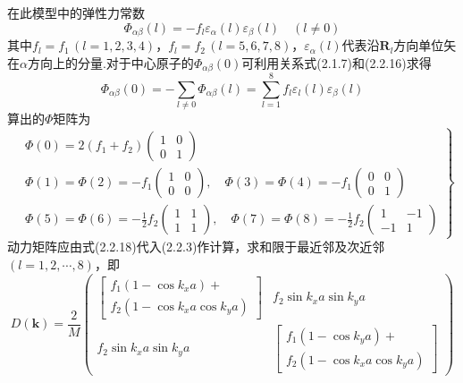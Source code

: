 在此模型中的弹性力常数
\begin{equation}
  \Phi_{\alpha\beta}(l)=-f_l\varepsilon_{\alpha}(l)\varepsilon_{\beta}(l)
  \quad(l\neq0)
\end{equation}
其中$f_l=f_1\,(l=1,2,3,4)$，$f_l=f_2\,(l=5,6,7,8)$，$\varepsilon_{\alpha}(l)$代表沿$\boldsymbol{R}_l$方向单位矢在$\alpha$方向上的分量.对于中心原子的$\Phi_{\alpha\beta}(0)$可利用关系式(2.1.7)和(2.2.16)求得
\begin{equation}
  \Phi_{\alpha\beta}(0)=-\sum_{l\neq0}\Phi_{\alpha\beta}(l)
  =\sum_{l=1}^{8}f_l\varepsilon_l(l)\varepsilon_{\beta}(l)
\end{equation}
算出的$\Phi$矩阵为
\begin{equation}
\left.\begin{aligned}
  &\Phi(0)=2(f_1+f_2)\begin{pmatrix}1&0\\0&1\end{pmatrix}\\
  &\Phi(1)=\Phi(2)=-f_1\begin{pmatrix}1&0\\0&0\end{pmatrix},
  \quad\Phi(3)=\Phi(4)=-f_1\begin{pmatrix}0&0\\0&1\end{pmatrix}\\
  &\Phi(5)=\Phi(6)=-\frac{1}{2}f_2\begin{pmatrix}1&1\\1&1\end{pmatrix},
  \quad\Phi(7)=\Phi(8)=-\frac{1}{2}f_2\begin{pmatrix}1&-1\\-1&1\end{pmatrix}
\end{aligned}\right\}
\end{equation}
动力矩阵应由式(2.2.18)代入(2.2.3)作计算，求和限于最近邻及次近邻$(l=1,2,\cdots,8)$，即
\begin{equation}
  D(\boldsymbol{k})=\frac{2}{M}\left(\begin{array}{cc}
  \left[\begin{array}{l}f_1(1-\cos k_xa)+\\[0.3em]
  f_2(1-\cos k_xa\cos k_ya)\end{array}\right] & f_2\sin k_xa\sin k_ya\\[4ex]
  f_2\sin k_xa\sin k_ya &
  \left[\begin{array}{l}f_1(1-\cos k_ya)+\\[0.3em]
  f_2(1-\cos k_xa\cos k_ya)\end{array}\right]
  \end{array}\right)
\end{equation}
